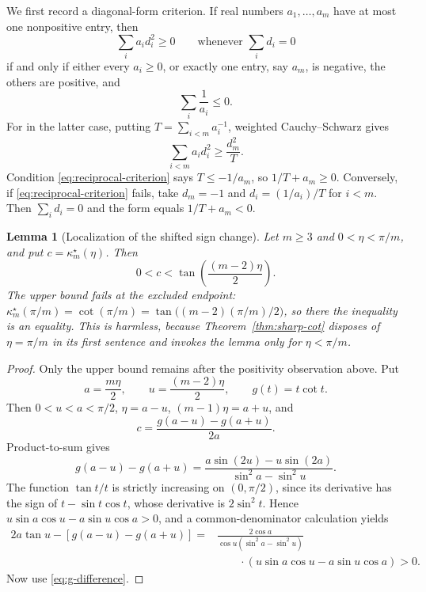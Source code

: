 \documentclass[11pt]{article}
\newtheorem{lemma}[theorem]{Lemma}
\theoremstyle{definition}
\begin{document}
We first record a diagonal-form criterion.  If real numbers
$a_1,\ldots,a_m$ have at most one nonpositive entry, then
\begin{equation}\label{eq:diag-criterion}
 \sum_i a_i d_i^2\geq0\qquad\text{whenever }\sum_i d_i=0
\end{equation}
if and only if either every $a_i\geq0$, or exactly one entry, say $a_m$, is
negative, the others are positive, and
\begin{equation}\label{eq:reciprocal-criterion}
 \sum_i\frac1{a_i}\leq0.
\end{equation}
For in the latter case, putting $T=\sum_{i<m}a_i^{-1}$, weighted
Cauchy--Schwarz gives
\[
 \sum_{i<m}a_i d_i^2\geq\frac{d_m^2}{T}.
\]
Condition \eqref{eq:reciprocal-criterion} says $T\leq-1/a_m$, so
$1/T+a_m\geq0$.  Conversely, if
\eqref{eq:reciprocal-criterion} fails, take $d_m=-1$ and
$d_i=(1/a_i)/T$ for $i<m$.  Then $\sum_i d_i=0$ and the form equals
$1/T+a_m<0$.

\begin{lemma}[Localization of the shifted sign change]
\label{lem:sharp-localization}
Let $m\geq3$ and $0<\eta<\pi/m$, and put $c=\kappa_m^\star(\eta)$.  Then
\begin{equation}\label{eq:sharp-localization}
 0<c<\tan\!\left(\frac{(m-2)\eta}{2}\right).
\end{equation}
The upper bound fails at the excluded endpoint: $\kappa_m^\star(\pi/m)=\cot(\pi/m)
=\tan\bigl((m-2)(\pi/m)/2\bigr)$, so there the inequality is an equality.  This is harmless, because
Theorem~\ref{thm:sharp-cot} disposes of $\eta=\pi/m$ in its first sentence and invokes the lemma only for
$\eta<\pi/m$.
\end{lemma}

\begin{proof}
Only the upper bound remains after the positivity observation above.  Put
\[
 a=\frac{m\eta}{2},\qquad u=\frac{(m-2)\eta}{2},
 \qquad g(t)=t\cot t.
\]
Then $0<u<a<\pi/2$, $\eta=a-u$, $(m-1)\eta=a+u$, and
\begin{equation}\label{eq:g-difference}
 c=\frac{g(a-u)-g(a+u)}{2a}.
\end{equation}
Product-to-sum gives
\[
 g(a-u)-g(a+u)
 =\frac{a\sin(2u)-u\sin(2a)}{\sin^2a-\sin^2u}.
\]
The function $\tan t/t$ is strictly increasing on $(0,\pi/2)$, since its
derivative has the sign of $t-\sin t\cos t$, whose derivative is
$2\sin^2t$.  Hence
$u\sin a\cos u-a\sin u\cos a>0$, and a common-denominator calculation yields
\begin{align*}
 2a\tan u-[g(a-u)-g(a+u)]
 ={}&\frac{2\cos a}{\cos u(\sin^2a-\sin^2u)}\\
 &\qquad\cdot
 (u\sin a\cos u-a\sin u\cos a)>0.
\end{align*}
Now use \eqref{eq:g-difference}.
\end{proof}
\end{document}
